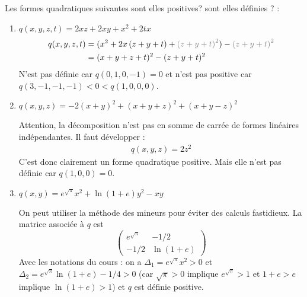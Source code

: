 \documentclass[a4paper]{article}
\begin{document}
 Les formes quadratiques suivantes sont elles positives? sont elles définies ? :
\begin{enumerate}
	\item $q(x,y,z,t) = 2xz + 2xy +x^2 + 2tx$
	\begin{align*}
		q(x,y,z,t)& =  (x^2 + 2x\left( z+y+t \right) +{\color{gray} \left( z+y+t \right)^2} ) - {\color{gray} \left( z+y+t \right)^2} \\
		& = (x+y+z+t)^2 - (z+y+t)^2
	\end{align*}
	N'est pas définie car $q(0,1,0,-1) = 0$ et n'est pas positive car  $ q(3,-1,-1,-1) < 0 < q(1,0,0,0) $.
\medskip
	
\item $q(x,y,z) = -2(x+y)^2 + (x+y+z)^2 + (x+y-z)^2$
	\medskip 

	Attention, la décomposition n'est pas en somme de carrée de formes linéaires indépendantes. Il faut développer :
	\begin{align*}
		q(x,y,z) =  2 z^2
	\end{align*}
	C'est donc clairement un forme quadratique positive. Mais elle n'est pas définie car $q(1,0,0) = 0 $.
\medskip

	\item $q(x,y)=e^{\sqrt{\pi}} x^2 + \ln(1+e) y^2 - xy$
		
		\medskip

On peut utiliser la méthode des mineurs pour éviter des calculs fastidieux. La matrice associée à $q$ est
\[
	\begin{pmatrix}
		e^{\sqrt{\pi}} & -1/2 \\ -1/2 & \ln(1+e) 
	\end{pmatrix}
\]
Avec les notations du cours : on a $\Delta_1 =e^{\sqrt{\pi}} x^2  >0$ et $\Delta_2 = 	e^{\sqrt{\pi}}\ln(1+e) -1/4 >0$ (car $\sqrt{\pi} >0$ implique $e^{\sqrt{\pi}}>1$ et $1+e >e$ implique $\ln(1+e)>1$)  et $q$ est définie positive.
\end{enumerate}

\bigskip


\end{document}
